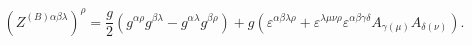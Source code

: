 \begin{equation}
\left( Z^{(B)\alpha \beta \lambda }\right) ^{\rho }=\frac{g}{2}\left(
g^{\alpha \rho }g^{\beta \lambda }-g^{\alpha \lambda }g^{\beta \rho }\right)
+g\left( \varepsilon ^{\alpha \beta \lambda \rho }+\varepsilon ^{\lambda \mu
\nu \rho }\varepsilon ^{\alpha \beta \gamma \delta }A_{\gamma (\mu
)}A_{\delta (\nu )}\right) .  \label{cin33}
\end{equation}

